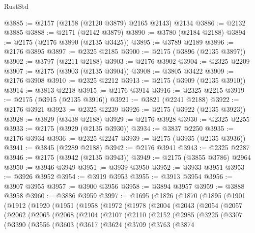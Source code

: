 \begin{lexlean}{RustStd}
\begin{coremodule}
@3885 := @2157 (@2158 (@2120 @3879) @2165 @2143) @2134
@3886 := @2132 @3885
@3888 := @2171 (@2142 @3879)
@3890 := @3780 (@2184 @2188)
@3894 := @2175 (@2176 @3890 (@2135 @3425))
@3895 := @3789 @2189
@3896 := @2176 @3895
@3897 := @2325 @2185
@3900 := @2175 (@3896 (@2135 @3897))
@3902 := @3797 (@2211 @2188)
@3903 := @2176 @3902
@3904 := @2325 @2209
@3907 := @2175 (@3903 (@2135 @3904))
@3908 := @3805 @3422
@3909 := @2176 @3908
@3910 := @2325 @2212
@3913 := @2175 (@3909 (@2135 @3910))
@3914 := @3813 @2218
@3915 := @2176 @3914
@3916 := @2325 @2215
@3919 := @2175 (@3915 (@2135 @3916))
@3921 := @3821 (@2241 @2188)
@3922 := @2176 @3921
@3923 := @2325 @2239
@3926 := @2175 (@3922 (@2135 @3923))
@3928 := @3829 (@3438 @2188)
@3929 := @2176 @3928
@3930 := @2325 @2255
@3933 := @2175 (@3929 (@2135 @3930))
@3934 := @3837 @2250
@3935 := @2176 @3934
@3936 := @2325 @2247
@3939 := @2175 (@3935 (@2135 @3936))
@3941 := @3845 (@2289 @2188)
@3942 := @2176 @3941
@3943 := @2325 @2287
@3946 := @2175 (@3942 (@2135 @3943))
@3949 := @2175 (@3855 @3786) @2964
@3950 := @3946 @3949
@3951 := @3939 @3950
@3952 := @3933 @3951
@3953 := @3926 @3952
@3954 := @3919 @3953
@3955 := @3913 @3954
@3956 := @3907 @3955
@3957 := @3900 @3956
@3958 := @3894 @3957
@3959 := @3888 @3958
@3960 := @3886 @3959
@3997 := @1695
    (@1826
      (@1870
        (@1895
          (@1901
            (@1912
              (@1920
                (@1951
                  (@1958
                    (@1972
                      (@1978
                        (@2004
                          (@2043
                            (@2054
                              (@2057
                                (@2062
                                  (@2065
                                    (@2068
                                      (@2104
                                        (@2107
                                          (@2110
                                            (@2152
                                              (@2985
                                                (@3225
                                                  (@3307
                                                    (@3390
                                                      (@3556
                                                        (@3603
                                                          (@3617
                                                            (@3624
                                                              (@3709
                                                                (@3763
                                                                  (@3874

\end{coremodule}
\end{lexlean}
